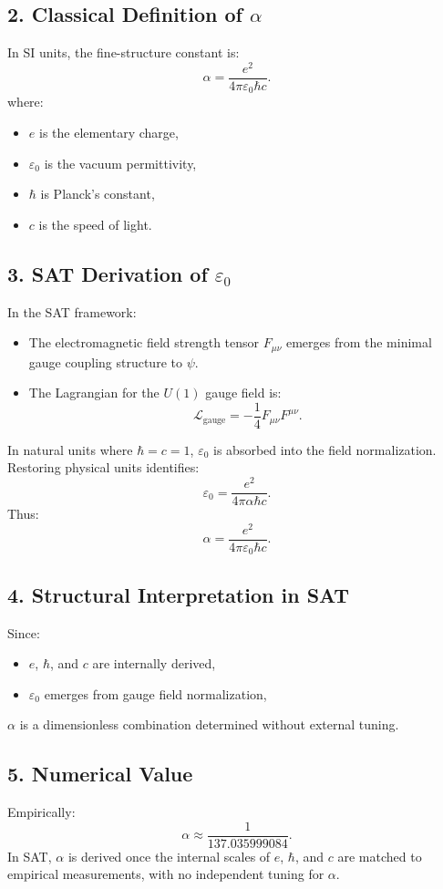 \documentclass[12pt]{article}
\begin{document}
\subsection*{2. Classical Definition of \(\alpha\)}
In SI units, the fine-structure constant is:
\[
\alpha = \frac{e^2}{4\pi \varepsilon_0 \hbar c}.
\]
where:
\begin{itemize}
    \item \(e\) is the elementary charge,
    \item \(\varepsilon_0\) is the vacuum permittivity,
    \item \(\hbar\) is Planck’s constant,
    \item \(c\) is the speed of light.
\end{itemize}

\subsection*{3. SAT Derivation of \(\varepsilon_0\)}
In the SAT framework:
\begin{itemize}
    \item The electromagnetic field strength tensor \(F_{\mu\nu}\) emerges from the minimal gauge coupling structure to \(\psi\).
    \item The Lagrangian for the \(U(1)\) gauge field is:
    \[
    \mathcal{L}_\text{gauge} = -\frac{1}{4} F_{\mu\nu} F^{\mu\nu}.
    \]
\end{itemize}
In natural units where \(\hbar = c = 1\), \(\varepsilon_0\) is absorbed into the field normalization. Restoring physical units identifies:
\[
\varepsilon_0 = \frac{e^2}{4\pi \alpha \hbar c}.
\]
Thus:
\[
\alpha = \frac{e^2}{4\pi \varepsilon_0 \hbar c}.
\]

\subsection*{4. Structural Interpretation in SAT}
Since:
\begin{itemize}
    \item \(e\), \(\hbar\), and \(c\) are internally derived,
    \item \(\varepsilon_0\) emerges from gauge field normalization,
\end{itemize}
\(\alpha\) is a dimensionless combination determined without external tuning.

\subsection*{5. Numerical Value}
Empirically:
\[
\alpha \approx \frac{1}{137.035999084}.
\]
In SAT, \(\alpha\) is derived once the internal scales of \(e\), \(\hbar\), and \(c\) are matched to empirical measurements, with no independent tuning for \(\alpha\).
\end{document}
